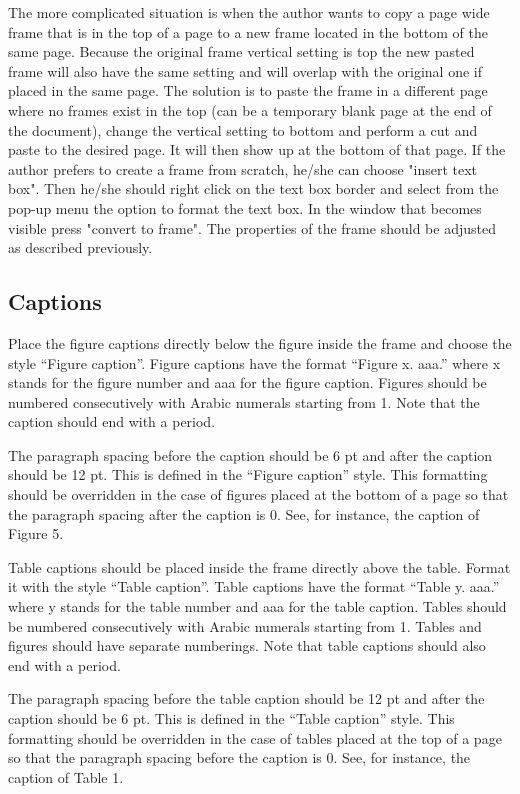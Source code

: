 \documentclass[10pt]{imeko_acta}
\begin{document}
The more complicated situation is when the author wants to copy a page wide frame that is in the top of a page to a new frame located in the bottom of the same page. Because the original frame vertical setting is top the new pasted frame will also have the same setting and will overlap with the original one if placed in the same page. The solution is to paste the frame in a different page where no frames exist in the top (can be a temporary blank page at the end of the document), change the vertical setting to bottom and perform a cut and paste to the desired page. It will then show up at the bottom of that page.
If the author prefers to create a frame from scratch, he/she can choose "insert text box". Then he/she should right click on the text box border and select from the pop-up menu the option to format the text box. In the window that becomes visible press "convert to frame". The properties of the frame should be adjusted as described previously.




\subsection{Captions}

Place the figure captions directly below the figure inside the frame and choose the style “Figure caption”. Figure captions have the format “Figure x. aaa.” where x stands for the figure number and aaa for the figure caption. Figures should be numbered consecutively with Arabic numerals starting from 1. Note that the caption should end with a period. 

The paragraph spacing before the caption should be 6 pt and after the caption should be 12 pt. This is defined in the “Figure caption” style. This formatting should be overridden in the case of figures placed at the bottom of a page so that the paragraph spacing after the caption is 0. See, for instance, the caption of Figure 5.

Table captions should be placed inside the frame directly above the table. Format it with the style “Table caption”. Table captions have the format “Table y. aaa.” where y stands for the table number and aaa for the table caption. Tables should be numbered consecutively with Arabic numerals starting from 1. Tables and figures should have separate numberings. Note that table captions should also end with a period. 

The paragraph spacing before the table caption should be 12 pt and after the caption should be 6 pt. This is defined in the “Table caption” style. This formatting should be overridden in the case of tables placed at the top of a page so that the paragraph spacing before the caption is 0. See, for instance, the caption of Table 1.
\end{document}
